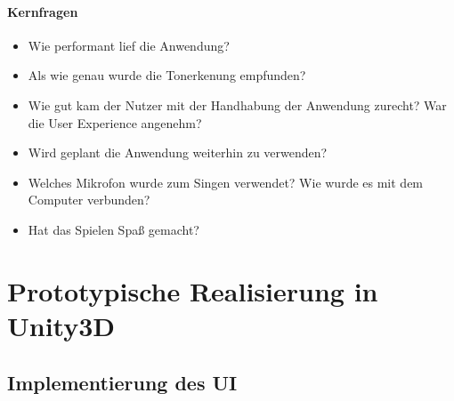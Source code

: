 \subsubsection*{Kernfragen}
\begin{itemize}
    \item Wie performant lief die Anwendung?
    \item Als wie genau wurde die Tonerkenung empfunden?
    \item Wie gut kam der Nutzer mit der Handhabung der Anwendung zurecht? War die User Experience angenehm?
    \item Wird geplant die Anwendung weiterhin zu verwenden?
    \item Welches Mikrofon wurde zum Singen verwendet? Wie wurde es mit dem Computer verbunden?
    \item Hat das Spielen Spaß gemacht?
\end{itemize}

\chapter{Prototypische Realisierung in Unity3D}

\section{Implementierung des UI}

